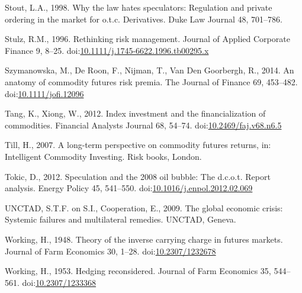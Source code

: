 \documentclass[]{elsarticle} %
\begin{document}
\leavevmode\hypertarget{ref-stout_why_1998}{}%
Stout, L.A., 1998. Why the law hates speculators: Regulation and private
ordering in the market for o.t.c. Derivatives. Duke Law Journal 48,
701--786.

\leavevmode\hypertarget{ref-stulz_rethink_1996}{}%
Stulz, R.M., 1996. Rethinking risk management. Journal of Applied
Corporate Finance 9, 8--25.
doi:\href{https://doi.org/10.1111/j.1745-6622.1996.tb00295.x}{10.1111/j.1745-6622.1996.tb00295.x}

\leavevmode\hypertarget{ref-szymanowska_anatomy_2014}{}%
Szymanowska, M., De Roon, F., Nijman, T., Van Den Goorbergh, R., 2014.
An anatomy of commodity futures risk premia. The Journal of Finance 69,
453--482.
doi:\href{https://doi.org/10.1111/jofi.12096}{10.1111/jofi.12096}

\leavevmode\hypertarget{ref-tang_index_2012}{}%
Tang, K., Xiong, W., 2012. Index investment and the financialization of
commodities. Financial Analysts Journal 68, 54--74.
doi:\href{https://doi.org/10.2469/faj.v68.n6.5}{10.2469/faj.v68.n6.5}

\leavevmode\hypertarget{ref-till_long_2007}{}%
Till, H., 2007. A long-term perspective on commodity futures returns,
in: Intelligent Commodity Investing. Risk books, London.

\leavevmode\hypertarget{ref-tokic_speculation_2012}{}%
Tokic, D., 2012. Speculation and the 2008 oil bubble: The d.c.o.t.
Report analysis. Energy Policy 45, 541--550.
doi:\href{https://doi.org/10.1016/j.enpol.2012.02.069}{10.1016/j.enpol.2012.02.069}

\leavevmode\hypertarget{ref-unctad_global_2009}{}%
UNCTAD, S.T.F. on S.I., Cooperation, E., 2009. The global economic
crisis: Systemic failures and multilateral remedies. UNCTAD, Geneva.

\leavevmode\hypertarget{ref-working_theory_1948}{}%
Working, H., 1948. Theory of the inverse carrying charge in futures
markets. Journal of Farm Economics 30, 1--28.
doi:\href{https://doi.org/10.2307/1232678}{10.2307/1232678}

\leavevmode\hypertarget{ref-working_hedging_1953}{}%
Working, H., 1953. Hedging reconsidered. Journal of Farm Economics 35,
544--561. doi:\href{https://doi.org/10.2307/1233368}{10.2307/1233368}
\end{document}
